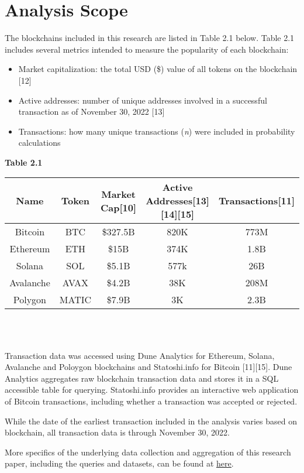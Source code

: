 \documentclass[12pt]{article}
\begin{document}
\section{Analysis Scope}
The blockchains included in this research are listed in Table 2.1 below. Table 2.1 includes several metrics intended to measure the popularity of each blockchain:
\begin{itemize}
	\item Market capitalization: the total USD (\$) value of all tokens on the blockchain [12]
	\item Active addresses: number of unique addresses involved in a successful transaction as of November 30, 2022 [13] 
	\item Transactions: how many unique transactions (\emph{n}) were included in probability calculations \\
\end{itemize}
\textbf{Table 2.1}\\
\begin{tabular}{| c | c | c | c | c |}
\hline
\textbf{Name} & \textbf{Token} & \textbf{Market Cap}[10] & \textbf{Active Addresses}[13][14][15] & \textbf{Transactions}[11] \\
\hline
Bitcoin & BTC & \$327.5B & 820K&773M\\
Ethereum & ETH & \$15B & 374K&1.8B\\
Solana & SOL & \$5.1B & 577k&26B\\
Avalanche & AVAX & \$4.2B & 38K& 208M \\
Polygon & MATIC & \$7.9B & 3K&2.3B\\
\hline
\end{tabular}\\
\\
\par Transaction data was accessed using Dune Analytics for Ethereum, Solana, Avalanche and Poloygon blockchains and Statoshi.info for Bitcoin [11][15]. Dune Analytics aggregates raw blockchain transaction data and stores it in a SQL accessible table for querying. Statoshi.info provides an interactive web application of Bitcoin transactions, including whether a transaction was accepted or rejected. 

While the date of the earliest transaction included in the analysis varies based on blockchain, all transaction data is through November 30, 2022.

More specifics of the underlying data collection and aggregation of this research paper, including the queries and datasets, can be found at \href{http://github.com/jamesomalley/EE104}{\underline{here}}.
\end{document}
